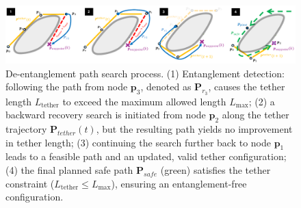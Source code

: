 \begin{figure}[h]
    \centering
    \includegraphics[width=\textwidth]{EA-Planner/figures/planner.pdf}
    \caption{De-entanglement path search process. 
    (1) Entanglement detection: following the path from node \( \mathbf{p}_3 \), denoted as \( \mathbf{P}_{r_3} \), causes the tether length \( L_{\text{tether}} \) to exceed the maximum allowed length \( L_{\text{max}} \); 
    (2) a backward recovery search is initiated from node \( \mathbf{p}_2 \) along the tether trajectory \( \mathbf{P}_{tether}(t) \), but the resulting path yields no improvement in tether length; 
    (3) continuing the search further back to node \( \mathbf{p}_1 \) leads to a feasible path and an updated, valid tether configuration; 
    (4) the final planned safe path \( \mathbf{P}_{safe} \) (green) satisfies the tether constraint (\( L_{\text{tether}} \leq L_{\text{max}} \)), ensuring an entanglement-free configuration.}
    \label{fig:planner_search}
\end{figure}




